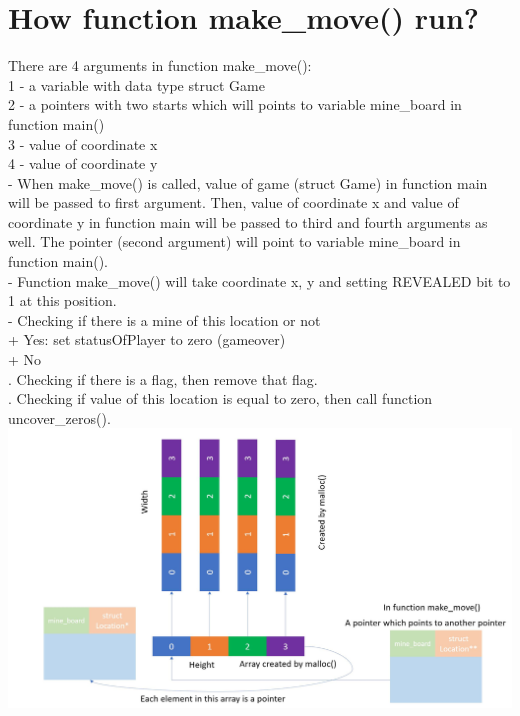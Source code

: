 \documentclass[a4paper,12pt]{article}
\begin{document}
\section*{How function make\_move() run?}
There are 4 arguments in function make\_move():\\
\hspace*{1cm}1 - a variable with data type struct Game\\
\hspace*{1cm}2 - a pointers with two starts which will points to variable mine\_board in function main()\\
\hspace*{1cm}3 - value of coordinate x\\
\hspace*{1cm}4 - value of coordinate y\\
\newline{}
- When make\_move() is called, value of game (struct Game) in function main will be passed to first argument. Then, value of coordinate x and value of coordinate y in function main will be passed to third and fourth arguments as well. The pointer (second argument) will point to variable mine\_board in function main().\\
- Function make\_move() will take coordinate x, y and setting REVEALED bit to 1 at this position.\\
- Checking if there is a mine of this location or not\\
\hspace{1cm}+ Yes: set statusOfPlayer to zero (gameover)\\
\hspace{1cm}+ No\\
\hspace{2cm}. Checking if there is a flag, then remove that flag.\\
\hspace{2cm}. Checking if value of this location is equal to zero, then call function uncover\_zeros().\\
\includegraphics[width=\textwidth]{Capture.JPG}
\end{document}

